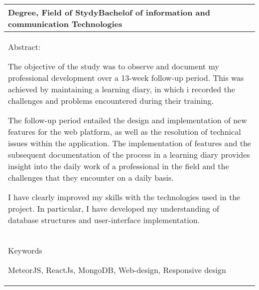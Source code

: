 \begin{tabular}{ | l | }
    \begin{minipage}[t][1.5cm][t]{10cm}
    Degree, Field of Stydy\newline  Bachelof of information and communication Technologies

    \end{minipage}\\ \hline

    \begin{minipage}[t][7.5cm][t]{14.5cm}
    Abstract: \medskip 

    The objective of the study was to observe and document my professional development over a 13-week follow-up period.
        This was achieved by maintaining a learning diary, 
        in which i recorded the challenges and problems encountered during their training. \medskip

    The follow-up period entailed the design and implementation of new features for the web platform,
        as well as the resolution of technical issues within the application.
        The implementation of features and the subsequent documentation of the process in a learning diary provides insight into the daily work of a professional in the field and the challenges that they encounter on a daily basis. \medskip

    I have clearly improved my skills with the technologies used in the project. 
        In particular, I have developed my understanding of database structures and user-interface implementation.

    \end{minipage}\\ \hline

    \begin{minipage}[t][2cm][t]{14cm}
        Keywords
        \medskip

        MeteorJS, ReactJs, MongoDB, Web-design, Responsive design 
    \end{minipage}\\ \hline

\end{tabular}
